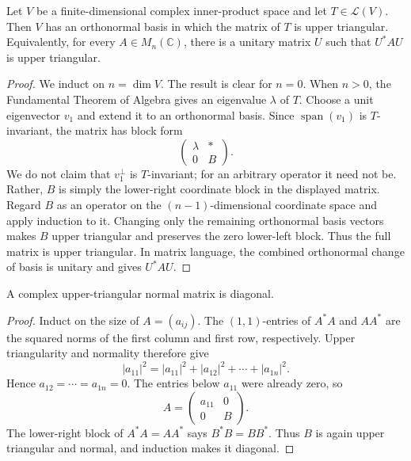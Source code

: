 \begin{theorem}\label{thm:schur-triangularization}
Let \(V\) be a finite-dimensional complex inner-product space and let
\(T\in\mathcal L(V)\). Then \(V\) has an orthonormal basis in which the
matrix of \(T\) is upper triangular. Equivalently, for every
\(A\in M_n(\mathbb C)\), there is a unitary matrix \(U\) such that
\(U^*AU\) is upper triangular.
\end{theorem}
\begin{proof}
We induct on \(n=\dim V\). The result is clear for \(n=0\). When \(n>0\),
the Fundamental Theorem of Algebra gives an eigenvalue \(\lambda\) of \(T\).
Choose a unit eigenvector \(v_1\) and extend it to an orthonormal basis.
Since \(\operatorname{span}(v_1)\) is \(T\)-invariant, the matrix has block
form
\[
\begin{pmatrix}\lambda&*\\0&B\end{pmatrix}.
\]
We do not claim that \(v_1^\perp\) is \(T\)-invariant; for an arbitrary
operator it need not be. Rather, \(B\) is simply the lower-right coordinate
block in the displayed matrix. Regard \(B\) as an operator on the
\((n-1)\)-dimensional coordinate space and apply induction to it. Changing
only the remaining orthonormal basis vectors makes \(B\) upper triangular
and preserves the zero lower-left block. Thus the full matrix is upper
triangular. In matrix language, the combined orthonormal change of basis is
unitary and gives \(U^*AU\).
\end{proof}

\begin{lemma}
\label{lem:normal-upper-triangular-diagonal}
A complex upper-triangular normal matrix is diagonal.
\end{lemma}
\begin{proof}
Induct on the size of \(A=(a_{ij})\). The \((1,1)\)-entries of \(A^*A\)
and \(AA^*\) are the squared norms of the first column and first row,
respectively. Upper triangularity and normality therefore give
\[
|a_{11}|^2
=|a_{11}|^2+|a_{12}|^2+\cdots+|a_{1n}|^2.
\]
Hence \(a_{12}=\cdots=a_{1n}=0\). The entries below \(a_{11}\) were already
zero, so
\[
A=\begin{pmatrix}a_{11}&0\\0&B\end{pmatrix}.
\]
The lower-right block of \(A^*A=AA^*\) says \(B^*B=BB^*\). Thus \(B\) is
again upper triangular and normal, and induction makes it diagonal.
\end{proof}

